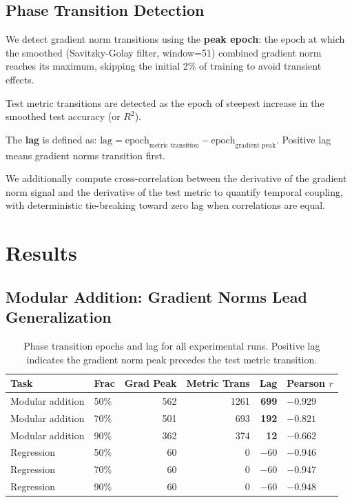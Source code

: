 \documentclass[11pt,a4paper]{article}
\begin{document}
\subsection{Phase Transition Detection}

We detect gradient norm transitions using the \textbf{peak epoch}: the epoch at which the smoothed (Savitzky-Golay filter, window=51) combined gradient norm reaches its maximum, skipping the initial 2\% of training to avoid transient effects.

Test metric transitions are detected as the epoch of steepest increase in the smoothed test accuracy (or $R^2$).

The \textbf{lag} is defined as: $\text{lag} = \text{epoch}_\text{metric transition} - \text{epoch}_\text{gradient peak}$. Positive lag means gradient norms transition first.

We additionally compute cross-correlation between the derivative of the gradient norm signal and the derivative of the test metric to quantify temporal coupling, with deterministic tie-breaking toward zero lag when correlations are equal.

\section{Results}

\subsection{Modular Addition: Gradient Norms Lead Generalization}

\begin{table}[h]
\centering
\caption{Phase transition epochs and lag for all experimental runs. Positive lag indicates the gradient norm peak precedes the test metric transition.}
\label{tab:results}
\begin{tabular}{llrrrl}
\toprule
Task & Frac & Grad Peak & Metric Trans & Lag & Pearson $r$ \\
\midrule
Modular addition & 50\% & 562 & 1261 & \textbf{699} & $-0.929$ \\
Modular addition & 70\% & 501 & 693 & \textbf{192} & $-0.821$ \\
Modular addition & 90\% & 362 & 374 & \textbf{12} & $-0.662$ \\
\midrule
Regression & 50\% & 60 & 0 & $-60$ & $-0.946$ \\
Regression & 70\% & 60 & 0 & $-60$ & $-0.947$ \\
Regression & 90\% & 60 & 0 & $-60$ & $-0.948$ \\
\bottomrule
\end{tabular}
\end{table}
\end{document}
